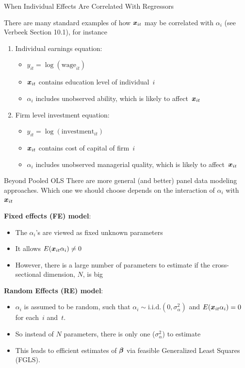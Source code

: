 \documentclass[english, professionalfonts,smaller,xcolor=dvipsnames]{beamer}
\begin{document}
\begin{frame}{When Individual Effects Are Correlated With Regressors}

There are many standard examples of how $\bm x_{it}$ may be correlated with $\alpha_i$ (see Verbeek Section 10.1), for instance

\begin{enumerate}
\item[$\Rightarrow$] Individual earnings equation:
\begin{itemize}
\item $y_{it} = \log ( \text{wage}_{it})$
\item $\bm x_{it}$ contains education level of individual~$i$
\item $\alpha_i$ includes unobserved ability, which is likely to affect~$\bm x_{it}$
\end{itemize}
\item[$\Rightarrow$] Firm level investment equation:
\begin{itemize}
\item $y_{it} = \log ( \text{investment}_{it})$
\item $\bm x_{it}$ contains cost of capital of firm~$i$
\item $\alpha_i$ includes unobserved managerial quality, which is likely to affect~$\bm x_{it}$
\end{itemize}
\end{enumerate}
\end{frame}

\begin{frame}{Beyond Pooled OLS}
There are more general (and better) panel data modeling approaches. Which one we should choose depends on the interaction of $\alpha_i$ with $\bm x_{it}$

\textbf{Fixed effects (FE) model}:
\begin{itemize}
\item The $\alpha_i$'s are viewed as fixed unknown parameters
\item It allows $E(\bm x_{it} \alpha_i) \neq 0$
\item However, there is a large number of parameters to estimate if the cross-sectional dimension, $N$, is big
\end{itemize}
\textbf{Random Effects (RE) model}: 
\begin{itemize}
\item $\alpha_i$ is assumed to be random, such that $\alpha_i \sim \text{i.i.d.}(0,\sigma_{\alpha}^2)$ and $E(\bm x_{it}\alpha_i) = 0$ for each~$i$ and~$t$.
\item So instead of $N$ parameters, there is only one ($\sigma_\alpha^2$) to estimate
\item This leads to efficient estimates of $\bm \beta$ via feasible Generalized Least Squares (FGLS).
\end{itemize}
\end{frame}
\end{document}
